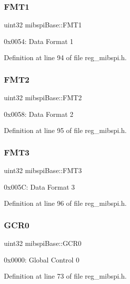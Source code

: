 \subsubsection{\texorpdfstring{F\+M\+T1}{FMT1}}
{\footnotesize\ttfamily uint32 mibspi\+Base\+::\+F\+M\+T1}

0x0054\+: Data Format 1 

Definition at line 94 of file reg\+\_\+mibspi.\+h.

\mbox{\label{structmibspiBase_a5a47902d3234417a356e4e482a08b538}} 
\subsubsection{\texorpdfstring{F\+M\+T2}{FMT2}}
{\footnotesize\ttfamily uint32 mibspi\+Base\+::\+F\+M\+T2}

0x0058\+: Data Format 2 

Definition at line 95 of file reg\+\_\+mibspi.\+h.

\mbox{\label{structmibspiBase_a3e748b3964095c6373002759f2355b22}} 
\subsubsection{\texorpdfstring{F\+M\+T3}{FMT3}}
{\footnotesize\ttfamily uint32 mibspi\+Base\+::\+F\+M\+T3}

0x005C\+: Data Format 3 

Definition at line 96 of file reg\+\_\+mibspi.\+h.

\mbox{\label{structmibspiBase_ac2a1e37e9c00c55fab5f6781ccfec27d}} 
\subsubsection{\texorpdfstring{G\+C\+R0}{GCR0}}
{\footnotesize\ttfamily uint32 mibspi\+Base\+::\+G\+C\+R0}

0x0000\+: Global Control 0 

Definition at line 73 of file reg\+\_\+mibspi.\+h.

\mbox{\label{structmibspiBase_ad690d4545fd4bdcb646de04d360f3157}} 
